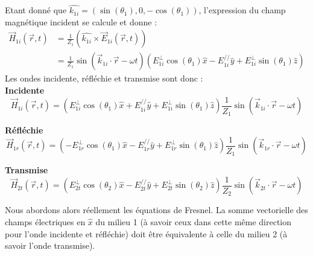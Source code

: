 Etant donné que $\hat{k_{1i}} = (\sin(\theta_{1}),0,-\cos(\theta_{1})) $, l'expression du champ magnétique incident se calcule et donne :
\begin{equation*}
\begin{split}
\vec{H}_{1i}(\vec{r},t)& = \frac{1}{Z_1} (\hat{k_{1i}} \times \vec{E}_{1i}(\vec{r},t))\\ &= \frac{1}{Z_1} \sin(\vec{k}_{1i}\cdot \vec{r} - \omega t)(E^{\perp}_{1i}\cos(\theta_{1}) \hat{x} - E^{//}_{1i} \hat{y} + E^{\perp}_{1i}\sin(\theta_{1}) \hat{z} )
\end{split}
\end{equation*}
Les ondes incidente, réfléchie et transmise sont donc :\\ 
\textbf{Incidente} $$ \vec{H}_{1i} (\vec{r},t) = (E^{\perp}_{1i}\cos(\theta_{1}) \hat{x} + E^{//}_{1i} \hat{y} + E^{\perp}_{1i}\sin(\theta_{1}) \hat{z} ) \frac{1}{Z_1} \sin(\vec{k}_{1i}\cdot \vec{r} - \omega t)$$

\textbf{Réfléchie} $$ \vec{H}_{1r} (\vec{r},t) = (-E^{\perp}_{1r} \cos(\theta_{1})  \hat{x} - E_{1r}^{//} \hat{y} + E_{1r}^{\perp} \sin(\theta_{1}) \hat{z} ) \frac{1}{Z_1} \sin(\vec{k}_{1r}\cdot \vec{r} - \omega t) $$

\textbf{Transmise} $$ \vec{H}_{2t} (\vec{r},t) = (E^{\perp}_{2t} \cos(\theta_{2})  \hat{x} - E_{2t}^{//} \hat{y} + E_{2t}^{\perp} \sin(\theta_{2}) \hat{z} ) \frac{1}{Z_2}\sin(\vec{k}_{2t}\cdot \vec{r} - \omega t) $$
 
Nous abordons alors réellement les équations de Fresnel.
 La somme vectorielle des champs électriques en $\hat{x}$ 
du milieu 1 (à savoir ceux dans cette même direction pour l'onde incidente et réfléchie) doit être équivalente à celle du milieu 2 (à savoir l'onde transmise).%




